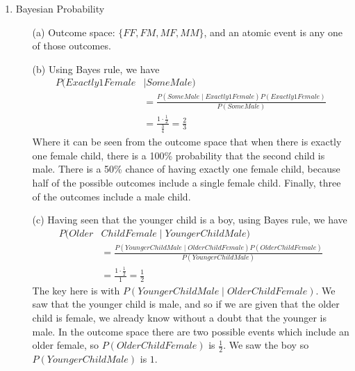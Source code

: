 \documentclass[12pt]{article}
\begin{document}
\begin{enumerate}
  \item Bayesian Probability \\
  	\begin{enumerate}
  		\item[(a)] Outcome space: $\{FF, FM, MF, MM\}$, and an atomic event is any one of those outcomes. 
  		\item[(b)] Using Bayes rule, we have \\
	  		\begin{align*}
	  			 P(Exactly 1 Female &\mid Some Male ) \\  &= \frac{P( Some Male \mid Exactly 1 Female) P(Exactly 1 Female)}{P(Some Male)} \\
	  			 & = \frac{1 \cdot \frac{1}{2}}{\frac{3}{4}} = \frac{2}{3}
	  		\end{align*} 
	  		Where it can be seen from the outcome space that when there is exactly one female child, there is a 100\% probability that the second child is male. There is a 50\% chance of having exactly one female child, because half of the possible outcomes include a single female child. Finally, three of the outcomes include a male child. \\
		\item[(c)] Having seen that the younger child is a boy, using Bayes rule, we have
	  		\begin{align*}
	  			 P( Older & Child Female \mid Younger Child Male ) \\
	  			  &= \frac{P( Younger Child Male \mid Older Child Female ) P(Older Child Female)}{P(Younger Child Male)} \\
	  			 & = \frac{1 \cdot \frac{1}{2}}{1} = \frac{1}{2}
	  		\end{align*} 
	  		The key here is with $P( Younger Child Male \mid Older Child Female )$. We saw that the younger child is male, and so if we are given that the older child is female, we already know without a doubt that the younger is male. In the outcome space there are two possible events which include an older female, so $P(Older Child Female)$ is $\frac{1}{2}$. We saw the boy so $P(Younger Child Male)$ is $1$.
	  	 
	  		
  	\end{enumerate}
  	

\end{enumerate}
\end{document}
